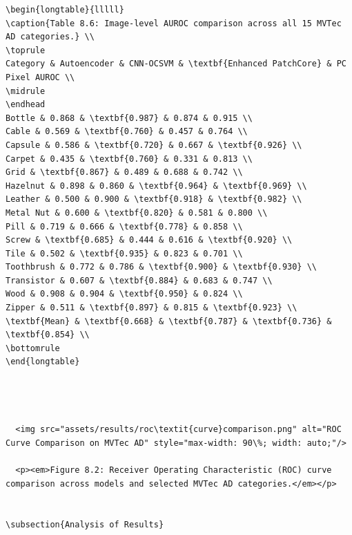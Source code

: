 \documentclass[12pt,a4paper,oneside]{report}
\begin{document}
\begin{verbatim}
\begin{longtable}{lllll}
\caption{Table 8.6: Image-level AUROC comparison across all 15 MVTec AD categories.} \\
\toprule
Category & Autoencoder & CNN-OCSVM & \textbf{Enhanced PatchCore} & PC Pixel AUROC \\
\midrule
\endhead
Bottle & 0.868 & \textbf{0.987} & 0.874 & 0.915 \\
Cable & 0.569 & \textbf{0.760} & 0.457 & 0.764 \\
Capsule & 0.586 & \textbf{0.720} & 0.667 & \textbf{0.926} \\
Carpet & 0.435 & \textbf{0.760} & 0.331 & 0.813 \\
Grid & \textbf{0.867} & 0.489 & 0.688 & 0.742 \\
Hazelnut & 0.898 & 0.860 & \textbf{0.964} & \textbf{0.969} \\
Leather & 0.500 & 0.900 & \textbf{0.918} & \textbf{0.982} \\
Metal Nut & 0.600 & \textbf{0.820} & 0.581 & 0.800 \\
Pill & 0.719 & 0.666 & \textbf{0.778} & 0.858 \\
Screw & \textbf{0.685} & 0.444 & 0.616 & \textbf{0.920} \\
Tile & 0.502 & \textbf{0.935} & 0.823 & 0.701 \\
Toothbrush & 0.772 & 0.786 & \textbf{0.900} & \textbf{0.930} \\
Transistor & 0.607 & \textbf{0.884} & 0.683 & 0.747 \\
Wood & 0.908 & 0.904 & \textbf{0.950} & 0.824 \\
Zipper & 0.511 & \textbf{0.897} & 0.815 & \textbf{0.923} \\
\textbf{Mean} & \textbf{0.668} & \textbf{0.787} & \textbf{0.736} & \textbf{0.854} \\
\bottomrule
\end{longtable}




  <img src="assets/results/roc\textit{curve}comparison.png" alt="ROC Curve Comparison on MVTec AD" style="max-width: 90\%; width: auto;"/>
  
  <p><em>Figure 8.2: Receiver Operating Characteristic (ROC) curve comparison across models and selected MVTec AD categories.</em></p>


\subsection{Analysis of Results}


\end{verbatim}
\end{document}
